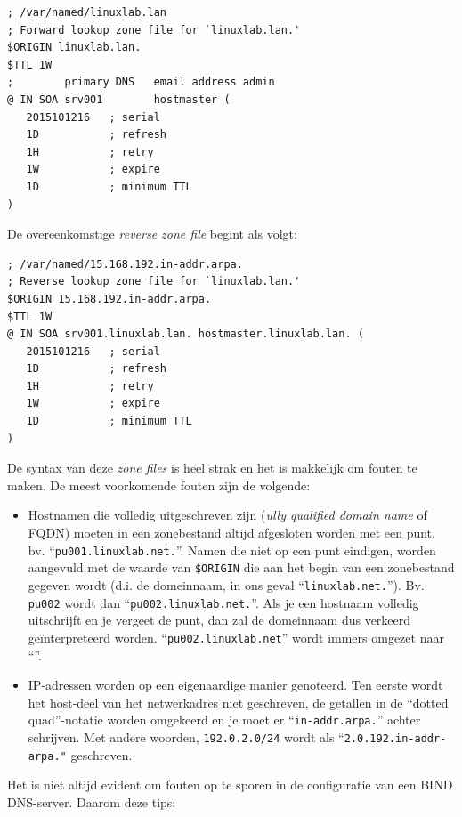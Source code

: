 \begin{verbatim}
; /var/named/linuxlab.lan
; Forward lookup zone file for `linuxlab.lan.'
$ORIGIN linuxlab.lan.
$TTL 1W
;        primary DNS   email address admin
@ IN SOA srv001        hostmaster (
   2015101216   ; serial
   1D           ; refresh
   1H           ; retry
   1W           ; expire
   1D           ; minimum TTL
)
\end{verbatim}

De overeenkomstige \emph{reverse zone file} begint als volgt:

\begin{verbatim}
; /var/named/15.168.192.in-addr.arpa.
; Reverse lookup zone file for `linuxlab.lan.'
$ORIGIN 15.168.192.in-addr.arpa.
$TTL 1W
@ IN SOA srv001.linuxlab.lan. hostmaster.linuxlab.lan. (
   2015101216   ; serial
   1D           ; refresh
   1H           ; retry
   1W           ; expire
   1D           ; minimum TTL
)
\end{verbatim}

De syntax van deze \emph{zone files} is heel strak en het is makkelijk om fouten te maken. De meest voorkomende fouten zijn de volgende:

\begin{itemize}
  \item Hostnamen die volledig uitgeschreven zijn (\emph{ully qualified domain name} of FQDN) moeten in een zonebestand altijd afgesloten worden met een punt, bv. ``\texttt{pu001.linuxlab.net.}''. Namen die niet op een punt eindigen, worden aangevuld met de waarde van \texttt{\$ORIGIN} die aan het begin van een zonebestand gegeven wordt (d.i. de domeinnaam, in ons geval ``\texttt{linuxlab.net.}''). Bv.  \texttt{pu002} wordt dan ``\texttt{pu002.linuxlab.net.}''. Als je een hostnaam volledig uitschrijft en je vergeet de punt, dan zal de domeinnaam dus verkeerd geïnterpreteerd worden. ``\texttt{pu002.linuxlab.net}'' wordt immers omgezet naar ``''.
\item IP-adressen worden op een eigenaardige manier genoteerd. Ten eerste wordt het host-deel van het netwerkadres niet geschreven, de getallen in de ``dotted quad''-notatie worden omgekeerd en je moet er ``\texttt{in-addr.arpa.}'' achter schrijven. Met andere woorden, \texttt{192.0.2.0/24} wordt als ``\texttt{2.0.192.in-addr-arpa."} geschreven.
\end{itemize}

Het is niet altijd evident om fouten op te sporen in de configuratie van een BIND DNS-server. Daarom deze tips:

